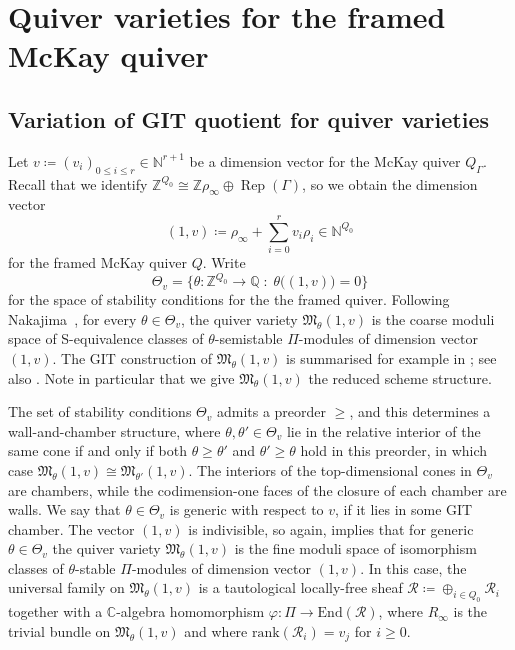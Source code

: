 \documentclass[10pt,a4paper]{amsart}
\newcommand{\SC}{\mathbb{C}} %
\newcommand{\Rep}{\operatorname{Rep}}
\numberwithin{equation}{section}
\begin{document}
\section{Quiver varieties for the framed McKay quiver}\label{sec:quivers}

\subsection{Variation of GIT quotient for quiver varieties}
\label{subsec:quivervars}

Let $v\coloneqq(v_i)_{0 \leq i \leq r} \in \mathbb{N}^{r+1}$ be a dimension vector for the McKay quiver $Q_\Gamma$.
Recall that we identify $\mathbb{Z}^{Q_0}\cong \mathbb{Z}\rho_{\infty}\oplus \Rep(\Gamma)$, so we obtain the
dimension vector \[(1,v) \coloneqq\rho_{\infty}+\sum_{i=0}^r v_i\rho_i \in \mathbb{N}^{Q_0}
\] for the framed McKay quiver $Q$. Write
\[ \Theta_{v}=\big\{\theta\colon \mathbb{Z}^{Q_0} \to \mathbb{Q}\; : \; \theta\big((1,v)\big)=0 \big\} \]
for the space of stability conditions for the
the framed quiver. Following Nakajima~\cite{nakajima1994instantons, Nakajima98}, for every $\theta \in \Theta_{v}$, the quiver variety $\mathfrak{M}_{\theta}(1,v)$ is the coarse moduli space of S-equivalence classes of $\theta$-semistable $\Pi$-modules of dimension vector $(1,v)$. The GIT construction of $\mathfrak{M}_{\theta}(1,v)$ is summarised for example in \cite[Section 2]{craw2019punctual}; see also \cite[Section 2]{nakajima2009quiver}. Note in particular that we give $\mathfrak{M}_{\theta}(1,v)$ the reduced scheme structure.


The set of stability conditions $\Theta_v$ admits a preorder $\geq$, and this determines a wall-and-chamber structure, where
$\theta,\theta' \in \Theta_v$ lie in the relative interior of the same cone if and only if both $\theta \geq \theta'$ and $\theta' \geq\theta$ hold in this preorder, in which case $\mathfrak{M}_{\theta}(1,v)\cong\mathfrak{M}_{\theta'}(1,v)$. The interiors of the top-dimensional cones in $\Theta_v$ are chambers, while the codimension-one faces of the closure of each chamber are walls. We say that $\theta \in \Theta_v$ is generic with respect to $v$, if it lies in some GIT chamber. The vector $(1,v)$ is indivisible, so again, \cite[Proposition~5.3]{king1994moduli} implies that for generic $\theta \in \Theta_v$ the quiver variety $\mathfrak{M}_{\theta}(1,v)$ is the fine moduli space of isomorphism classes of $\theta$-stable $\Pi$-modules of dimension vector $(1,v)$. In this case, the universal family on $\mathfrak{M}_{\theta}(1,v)$ is a tautological locally-free sheaf $\mathcal{R} \coloneqq \oplus_{i \in Q_0}\mathcal{R}_i$ together with a $\SC$-algebra homomorphism $\varphi \colon \Pi \to \mathrm{End}(\mathcal{R})$, where $R_\infty$ is the trivial bundle on $\mathfrak{M}_{\theta}(1,v)$ and where $\mathrm{rank}(\mathcal{R}_i) = v_j$ for $i \geq 0$.
\end{document}
